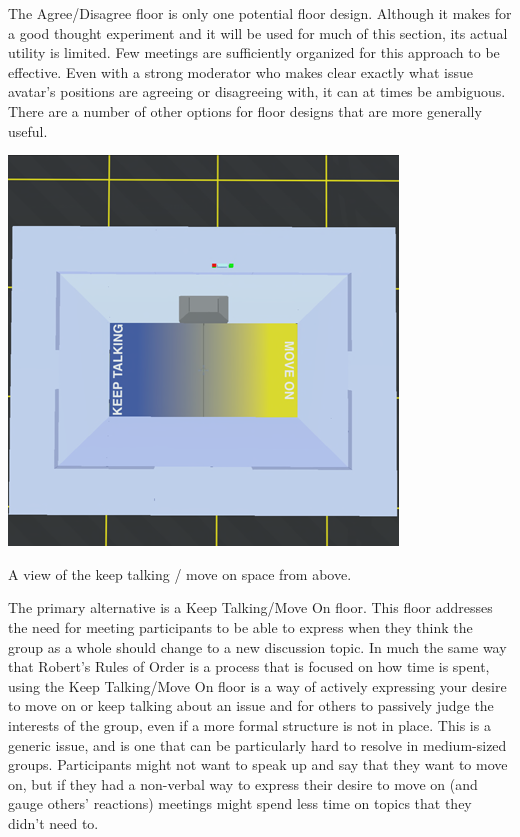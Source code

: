 The Agree/Disagree floor is only one potential floor design. Although it makes for a good thought experiment and it will be used for much of this section, its actual utility is limited. Few meetings are sufficiently organized for this approach to be effective. Even with a strong moderator who makes clear exactly what issue avatar's positions are agreeing or disagreeing with, it can at times be ambiguous. There are a number of other options for floor designs that are more generally useful.

\begin{marginfigure}
	\includegraphics{figures/keep_talking_from_above.png}
	\caption{A view of the keep talking / move on space from above.}
	\label{fig:keep_talking_floor}
\end{marginfigure}

The primary alternative is a Keep Talking/Move On floor. This floor addresses the need for meeting participants to be able to express when they think the group as a whole should change to a new discussion topic. In much the same way that Robert's Rules of Order \citep{RobertIII:2000tq} is a process that is focused on how time is spent, using the Keep Talking/Move On floor is a way of actively expressing your desire to move on or keep talking about an issue and for others to passively judge the interests of the group, even if a more formal structure is not in place. This is a generic issue, and is one that can be particularly hard to resolve in medium-sized groups. Participants might not want to speak up and say that they want to move on, but if they had a non-verbal way to express their desire to move on (and gauge others' reactions) meetings might spend less time on topics that they didn't need to.





